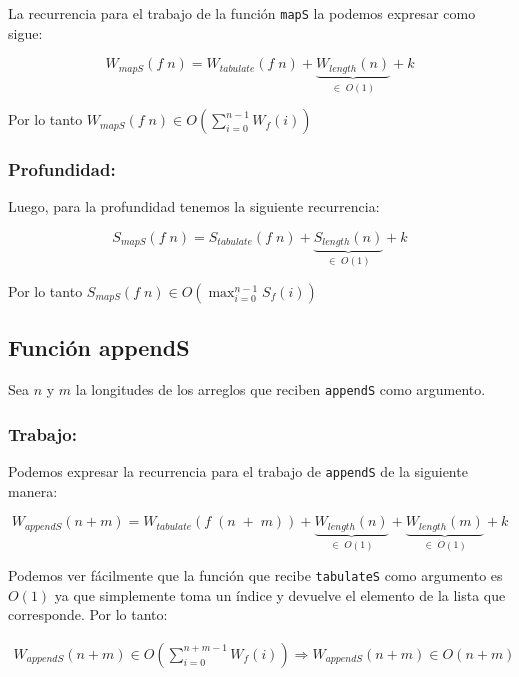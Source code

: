 \documentclass[11pt]{article}
\begin{document}
La recurrencia para el trabajo de la función \texttt{mapS} la podemos
expresar como sigue:

\begin{equation*}
    W_{mapS}(f \; n) = W_{tabulate}(f \; n) + \underbrace{W_{length}(n)}_{\in \; O(1)} + k
\end{equation*} 

Por lo tanto $ W_{mapS}(f \; n) \in O\left(\displaystyle\sum_{i=0}^{n - 1}W_f(i)\right) $

\subsubsection{Profundidad:}

Luego, para la profundidad tenemos la siguiente recurrencia:

\begin{equation*}
    S_{mapS}(f \; n) = S_{tabulate}(f \; n) + \underbrace{S_{length}(n)}_{\in \; O(1)} + k
\end{equation*} 

Por lo tanto $ S_{mapS}(f \; n) \in O\left(\displaystyle\max_{i=0}^{n - 1}S_f(i)\right) $


\subsection{Función appendS}
Sea $n$ y $m$ la longitudes de los arreglos que reciben \texttt{appendS} como
argumento. 
\subsubsection{Trabajo:}

Podemos expresar la recurrencia para el trabajo de \texttt{appendS} de 
la siguiente manera:

\begin{equation*}
    W_{appendS}(n + m) = W_{tabulate}(f \; (n \; +\; m)) + \underbrace{W_{length}(n)}_{\in \; O(1)}
    + \underbrace{W_{length}(m)}_{\in \; O(1)} + k
\end{equation*}

Podemos ver fácilmente que la función que recibe \texttt{tabulateS} como
argumento es $O(1)$ ya que simplemente toma un índice y devuelve el 
elemento de la lista que corresponde. Por lo tanto:

\begin{align*}
    W_{appendS}(n + m) \in O\left(\displaystyle\sum_{i=0}^{n + m - 1}W_f(i)\right)
    \Rightarrow W_{appendS}(n + m) \in O(n + m)
\end{align*}
\end{document}
